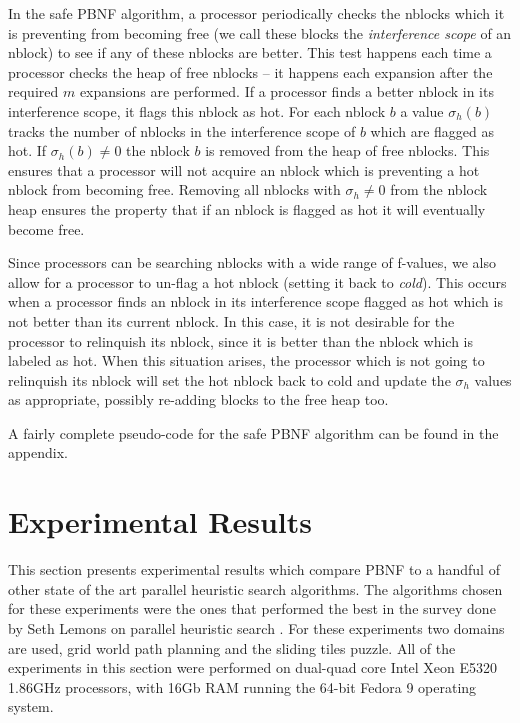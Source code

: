 \documentclass{article}
\begin{document}
In the safe PBNF algorithm, a processor periodically checks the
nblocks which it is preventing from becoming free (we call these
blocks the \emph{interference scope} of an nblock) to see if any of
these nblocks are better.  This test happens each time a processor
checks the heap of free nblocks -- it happens each expansion after the
required $m$ expansions are performed.  If a processor finds a better
nblock in its interference scope, it flags this nblock as hot.  For
each nblock $b$ a value $\sigma_h(b)$ tracks the number of nblocks in
the interference scope of $b$ which are flagged as hot.  If
$\sigma_h(b) \neq 0$ the nblock $b$ is removed from the heap of free
nblocks.  This ensures that a processor will not acquire an nblock
which is preventing a hot nblock from becoming free.  Removing all
nblocks with $\sigma_h \neq 0$ from the nblock heap ensures the
property that if an nblock is flagged as hot it will eventually become
free.

Since processors can be searching nblocks with a wide range of
f-values, we also allow for a processor to un-flag a hot nblock
(setting it back to \emph{cold}).  This occurs when a processor finds
an nblock in its interference scope flagged as hot which is not better
than its current nblock.  In this case, it is not desirable for the
processor to relinquish its nblock, since it is better than the nblock
which is labeled as hot.  When this situation arises, the processor
which is not going to relinquish its nblock will set the hot nblock
back to cold and update the $\sigma_h$ values as appropriate, possibly
re-adding blocks to the free heap too.

A fairly complete pseudo-code for the safe PBNF algorithm can be found
in the appendix.

\section{Experimental Results}

This section presents experimental results which compare PBNF to a
handful of other state of the art parallel heuristic search
algorithms.  The algorithms chosen for these experiments were the ones
that performed the best in the survey done by Seth Lemons on parallel
heuristic search \cite{lemons:sur}.  For these experiments two domains
are used, grid world path planning and the sliding tiles puzzle.  All
of the experiments in this section were performed on dual-quad core
Intel Xeon E5320 1.86GHz processors, with 16Gb RAM running the 64-bit
Fedora 9 operating system.
\end{document}
